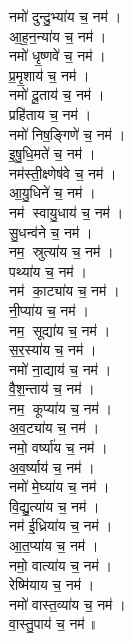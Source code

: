 \begin{multicols}{2}
\begin{flushleft}
नमो॑ दुन्दु॒भ्या॑य च॒ नम॑।\\
आ॒ह॒न॒न्या॑य च॒ नम॑।\\
नमो॑ धृ॒ष्णवे॑ च॒ नम॑।\\
प्र॒मृ॒शाय॑ च॒ नम॑।\\
नमो॑ दू॒ताय॑ च॒ नम॑।\\
प्रहि॑ताय च॒ नम॑।\\
नमो॑ निष॒ङ्गिणे॑ च॒ नम॑।\\
इ॒षु॒धि॒मते॑ च॒ नम॑।\\
नम॑स्ती॒क्ष्णेष॑वे च॒ नम॑।\\
आ॒यु॒धिने॑ च॒ नम॑।\hfill {}\\
नम॑ स्वायु॒धाय॑ च॒ नम॑।\\
सु॒धन्व॑ने च॒ नम॑।\\
नम॒ स्रुत्या॑य च॒ नम॑।\\
पथ्या॑य च॒ नम॑।\\
नम॑ का॒ट्या॑य च॒ नम॑।\\
नी॒प्या॑य च॒ नम॑।\\
नम॒ सूद्या॑य च॒ नम॑।\\
स॒र॒स्या॑य च॒ नम॑।\\
नमो॑ ना॒द्याय॑ च॒ नम॑।\\
वै॒श॒न्ताय॑ च॒ नम॑।\hfill {}\\
नम॒ कूप्या॑य च॒ नम॑।\\
अ॒व॒ट्या॑य च॒ नम॑।\\
नमो॒ वर्ष्या॑य च॒ नम॑।\\
अ॒व॒र्ष्याय॑ च॒ नम॑।\\
नमो॑ मे॒घ्या॑य च॒ नम॑।\\
वि॒द्यु॒त्या॑य च॒ नम॑।\\
नम॑ ई॒ध्रिया॑य च॒ नम॑।\\
आ॒त॒प्या॑य च॒ नम॑।\\
नमो॒ वात्या॑य च॒ नम॑।\\
रेष्मि॑याय च॒ नम॑।\hfill {}\\
नमो॑ वास्त॒व्या॑य च॒ नम॑।\\
वा॒स्तु॒पाय॑ च॒ नम॑॥\\


\end{flushleft}
\end{multicols}
